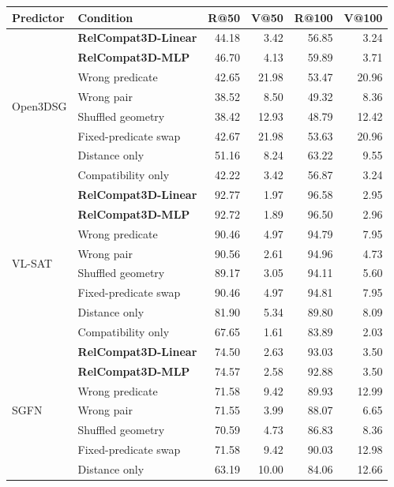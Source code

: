 \begin{table}[!t]
    \centering
    {\small
    \setlength{\tabcolsep}{1.0pt}
    \begin{tabular}{@{}llrrrr@{}}
    \toprule
    Predictor & Condition & R@50 & V@50 & R@100 & V@100 \\
    \midrule
    \multirow{8}{*}{Open3DSG} & \textbf{RelCompat3D-Linear} & 44.18 & 3.42 & 56.85 & 3.24 \\
    & \textbf{RelCompat3D-MLP} & 46.70 & 4.13 & 59.89 & 3.71 \\
    & Wrong predicate & 42.65 & 21.98 & 53.47 & 20.96 \\
    & Wrong pair & 38.52 & 8.50 & 49.32 & 8.36 \\
    & Shuffled geometry & 38.42 & 12.93 & 48.79 & 12.42 \\
    & Fixed-predicate swap & 42.67 & 21.98 & 53.63 & 20.96 \\
    & Distance only & 51.16 & 8.24 & 63.22 & 9.55 \\
    & Compatibility only & 42.22 & 3.42 & 56.87 & 3.24 \\
    \midrule
    \multirow{8}{*}{VL-SAT} & \textbf{RelCompat3D-Linear} & 92.77 & 1.97 & 96.58 & 2.95 \\
    & \textbf{RelCompat3D-MLP} & 92.72 & 1.89 & 96.50 & 2.96 \\
    & Wrong predicate & 90.46 & 4.97 & 94.79 & 7.95 \\
    & Wrong pair & 90.56 & 2.61 & 94.96 & 4.73 \\
    & Shuffled geometry & 89.17 & 3.05 & 94.11 & 5.60 \\
    & Fixed-predicate swap & 90.46 & 4.97 & 94.81 & 7.95 \\
    & Distance only & 81.90 & 5.34 & 89.80 & 8.09 \\
    & Compatibility only & 67.65 & 1.61 & 83.89 & 2.03 \\
    \midrule
    \multirow{8}{*}{SGFN} & \textbf{RelCompat3D-Linear} & 74.50 & 2.63 & 93.03 & 3.50 \\
    & \textbf{RelCompat3D-MLP} & 74.57 & 2.58 & 92.88 & 3.50 \\
    & Wrong predicate & 71.58 & 9.42 & 89.93 & 12.99 \\
    & Wrong pair & 71.55 & 3.99 & 88.07 & 6.65 \\
    & Shuffled geometry & 70.59 & 4.73 & 86.83 & 8.36 \\
    & Fixed-predicate swap & 71.58 & 9.42 & 90.03 & 12.98 \\
    & Distance only & 63.19 & 10.00 & 84.06 & 12.66 \\

\end{tabular}}
\end{table}
